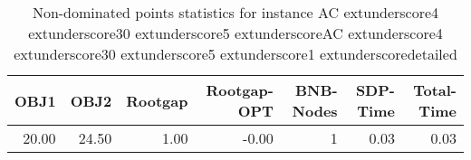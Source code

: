 \begin{table}
\caption{Non-dominated points statistics for instance AC	extunderscore4	extunderscore30	extunderscore5	extunderscoreAC	extunderscore4	extunderscore30	extunderscore5	extunderscore1	extunderscoredetailed}
\label{tab:stats/AC_4_30_5_AC_4_30_5_1_detailed}
\begin{tabular}{rrrrrrr}
\toprule
OBJ1 & OBJ2 & Rootgap & Rootgap-OPT & BNB-Nodes & SDP-Time & Total-Time \\
\midrule
20.00 & 24.50 & 1.00 & -0.00 & 1 & 0.03 & 0.03 \\
\bottomrule
\end{tabular}
\end{table}

